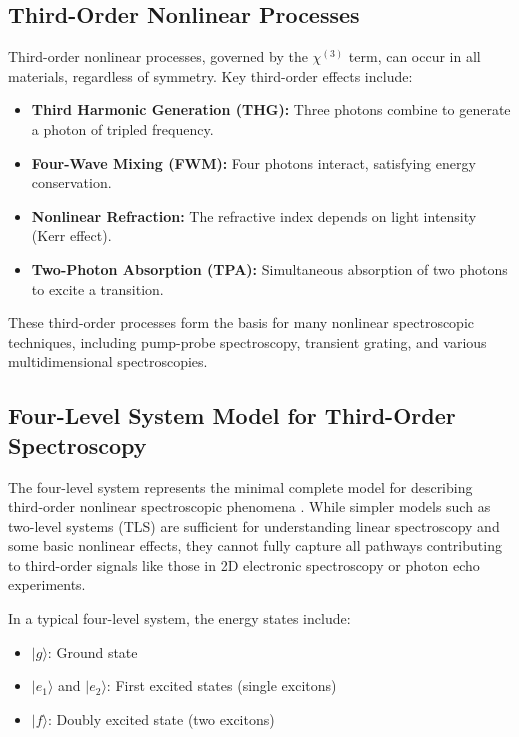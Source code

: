 \subsection{Third-Order Nonlinear Processes}
\label{subsec:third_order}

\noindent Third-order nonlinear processes, governed by the $\chi^{(3)}$ term, can occur in all materials, regardless of symmetry. Key third-order effects include:

\begin{itemize}
	\item \textbf{Third Harmonic Generation (THG):} Three photons combine to generate a photon of tripled frequency.
	\item \textbf{Four-Wave Mixing (FWM):} Four photons interact, satisfying energy conservation.
	\item \textbf{Nonlinear Refraction:} The refractive index depends on light intensity (Kerr effect).
	\item \textbf{Two-Photon Absorption (TPA):} Simultaneous absorption of two photons to excite a transition.
\end{itemize}

\noindent These third-order processes form the basis for many nonlinear spectroscopic techniques, including pump-probe spectroscopy, transient grating, and various multidimensional spectroscopies.

\subsection{Four-Level System Model for Third-Order Spectroscopy}
\label{subsec:four_level_model}

\noindent The four-level system represents the minimal complete model for describing third-order nonlinear spectroscopic phenomena \cite{cho2009twodimensionalopticalspectroscopy, abramaviciusetal2009coherentmultidimensionaloptical}. While simpler models such as two-level systems (TLS) are sufficient for understanding linear spectroscopy and some basic nonlinear effects, they cannot fully capture all pathways contributing to third-order signals like those in 2D electronic spectroscopy or photon echo experiments.

\noindent In a typical four-level system, the energy states include:

\begin{itemize}
	\item $|g\rangle$: Ground state
	\item $|e_1\rangle$ and $|e_2\rangle$: First excited states (single excitons)
	\item $|f\rangle$: Doubly excited state (two excitons)
\end{itemize}

